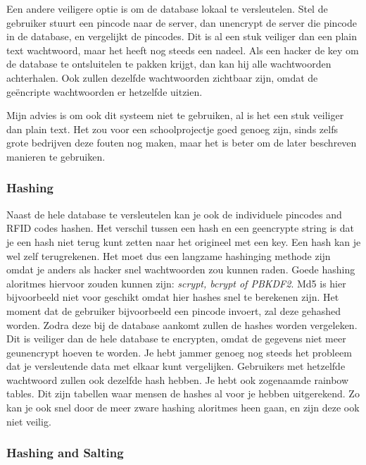 \documentclass{article}
\begin{document}
Een andere veiligere optie is om de database lokaal te versleutelen.
Stel de gebruiker stuurt een pincode naar de server, dan unencrypt de server die pincode in de database, en vergelijkt de pincodes.
Dit is al een stuk veiliger dan een plain text wachtwoord, maar het heeft nog steeds een nadeel.
Als een hacker de key om de database te ontsluitelen te pakken krijgt, dan kan hij alle wachtwoorden achterhalen.
Ook zullen dezelfde wachtwoorden zichtbaar zijn, omdat de ge\"encripte wachtwoorden er hetzelfde uitzien.

Mijn advies is om ook dit systeem niet te gebruiken, al is het een stuk veiliger dan plain text.
Het zou voor een schoolprojectje goed genoeg zijn, sinds zelfs grote bedrijven deze fouten nog maken, maar het is beter om de later beschreven manieren te gebruiken.

\newpage

\subsubsection{Hashing}

Naast de hele database te versleutelen kan je ook de individuele pincodes and RFID codes hashen.
Het verschil tussen een hash en een ge\:encrypte string is dat je een hash niet terug kunt zetten naar het origineel met een key. 
Een hash kan je wel zelf terugrekenen.
Het moet dus een langzame hashinging methode zijn omdat je anders als hacker snel wachtwoorden zou kunnen raden.
Goede hashing aloritmes hiervoor zouden kunnen zijn: \emph{scrypt, bcrypt of PBKDF2}.
Md5 is hier bijvoorbeeld niet voor geschikt omdat hier hashes snel te berekenen zijn.
Het moment dat de gebruiker bijvoorbeeld een pincode invoert, zal deze gehashed worden.
Zodra deze bij de database aankomt zullen de hashes worden vergeleken.
Dit is veiliger dan de hele database te encrypten, omdat de gegevens niet meer geunencrypt hoeven te worden.
Je hebt jammer genoeg nog steeds het probleem dat je versleutende data met elkaar kunt vergelijken.
Gebruikers met hetzelfde wachtwoord zullen ook dezelfde hash hebben.
Je hebt ook zogenaamde rainbow tables.
Dit zijn tabellen waar mensen de hashes al voor je hebben uitgerekend.
Zo kan je ook snel door de meer zware hashing aloritmes heen gaan, en zijn deze ook niet veilig.

\hfill

\centerline{  }

\subsubsection{Hashing and Salting}
\end{document}
